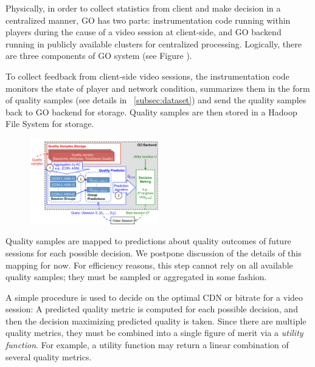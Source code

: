  Physically, in order to collect statistics from client and make decision in a centralized manner, GO has two parts: instrumentation code running within players during the cause of a video session at client-side, and GO backend running in publicly available clusters for centralized processing. Logically, there are three components of GO system (see Figure \fillme). 

 To collect feedback from client-side video sessions, the instrumentation code monitors the state of player and network condition, summarizes them in the form of quality samples (see details in \Section~\ref{subsec:dataset}) and send the quality samples back to GO backend for storage. Quality samples are then stored in a Hadoop File System for storage. 

\begin{figure}[h!]
\centering
 \includegraphics[width=0.5\textwidth] {figures/backend.pdf}
\label{fig:backend}
\end{figure}

 Quality samples are mapped to predictions about quality outcomes of future sessions for each possible decision.  We postpone discussion of the details of this mapping for now.  For efficiency reasons, this step cannot rely on all available quality samples; they must be sampled or aggregated in some fashion.

 A simple procedure is used to decide on the optimal CDN or bitrate for a video session: A predicted quality metric is computed for each possible decision, and then the decision maximizing predicted quality is taken.  Since there are multiple quality metrics, they must be combined into a single figure of merit via a \emph{utility function}.  For example, a utility function may return a linear combination of several quality metrics.

